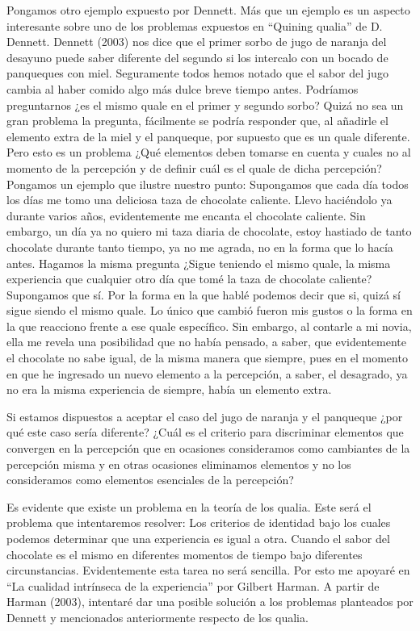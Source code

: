 \documentclass[]{book}
\begin{document}
\begin{refsection}
Pongamos otro ejemplo expuesto por Dennett. Más que un ejemplo es un
aspecto interesante sobre uno de los problemas expuestos en ``Quining
qualia'' de D. Dennett. Dennett (2003) nos dice que el primer sorbo de
jugo de naranja del desayuno puede saber diferente del segundo si los
intercalo con un bocado de panqueques con miel. Seguramente todos hemos
notado que el sabor del jugo cambia al haber comido algo más dulce breve
tiempo antes. Podríamos preguntarnos ¿es el mismo quale en el primer y
segundo sorbo? Quizá no sea un gran problema la pregunta, fácilmente se
podría responder que, al añadirle el elemento extra de la miel y el
panqueque, por supuesto que es un quale diferente. Pero esto es un
problema ¿Qué elementos deben tomarse en cuenta y cuales no al momento
de la percepción y de definir cuál es el quale de dicha percepción?
Pongamos un ejemplo que ilustre nuestro punto: Supongamos que cada día
todos los días me tomo una deliciosa taza de chocolate caliente. Llevo
haciéndolo ya durante varios años, evidentemente me encanta el chocolate
caliente. Sin embargo, un día ya no quiero mi taza diaria de chocolate,
estoy hastiado de tanto chocolate durante tanto tiempo, ya no me agrada,
no en la forma que lo hacía antes. Hagamos la misma pregunta ¿Sigue
teniendo el mismo quale, la misma experiencia que cualquier otro día que
tomé la taza de chocolate caliente? Supongamos que sí. Por la forma en
la que hablé podemos decir que si, quizá sí sigue siendo el mismo quale.
Lo único que cambió fueron mis gustos o la forma en la que reacciono
frente a ese quale específico. Sin embargo, al contarle a mi novia, ella
me revela una posibilidad que no había pensado, a saber, que
evidentemente el chocolate no sabe igual, de la misma manera que
siempre, pues en el momento en que he ingresado un nuevo elemento a la
percepción, a saber, el desagrado, ya no era la misma experiencia de
siempre, había un elemento extra.

Si estamos dispuestos a aceptar el caso del jugo de naranja y el
panqueque ¿por qué este caso sería diferente? ¿Cuál es el criterio para
discriminar elementos que convergen en la percepción que en ocasiones
consideramos como cambiantes de la percepción misma y en otras ocasiones
eliminamos elementos y no los consideramos como elementos esenciales de
la percepción?

Es evidente que existe un problema en la teoría de los qualia. Este será
el problema que intentaremos resolver: Los criterios de identidad bajo
los cuales podemos determinar que una experiencia es igual a otra.
Cuando el sabor del chocolate es el mismo en diferentes momentos de
tiempo bajo diferentes circunstancias. Evidentemente esta tarea no será
sencilla. Por esto me apoyaré en ``La cualidad intrínseca de la
experiencia'' por Gilbert Harman. A partir de Harman (2003), intentaré
dar una posible solución a los problemas planteados por Dennett y
mencionados anteriormente respecto de los qualia.


\end{refsection}
\end{document}
